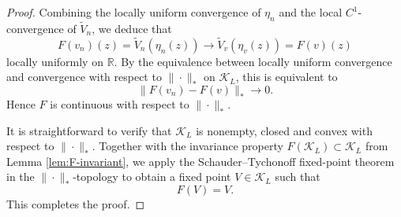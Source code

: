 \documentclass[preprint,sort&compress,final,12pt]{elsarticle}
\numberwithin{equation}{section}
\begin{document}
\begin{proof}
Combining the locally uniform convergence of $\eta_n$ and the local $C^1$-convergence of $\widetilde V_n$, we deduce that
\begin{equation*}
F(v_n)(z)=\widetilde V_n(\eta_n(z))\to \widetilde V_v(\eta_v(z))=F(v)(z)
\end{equation*}
locally uniformly on $\mathbb R$. By the equivalence between locally uniform convergence and convergence with respect to $\|\cdot\|_*$ on $\mathcal K_L$, this is equivalent to
\begin{equation*}
\|F(v_n)-F(v)\|_*\to0.
\end{equation*}
Hence $F$ is continuous with respect to $\|\cdot\|_*$.

It is straightforward to verify that $\mathcal K_L$ is nonempty, closed and convex with respect to $\|\cdot\|_*$. Together with the invariance property $F(\mathcal K_L)\subset\mathcal K_L$ from Lemma \ref{lem:F-invariant}, we apply the  Schauder--Tychonoff fixed-point theorem \cite[Theorem 1.13 p. 148]{Dugundji-Granas-1982} in the $\|\cdot\|_*$-topology to obtain a fixed point $V\in\mathcal K_L$ such that
\begin{equation*}
F(V)=V.
\end{equation*}
 This completes the proof.
\end{proof}
\end{document}
